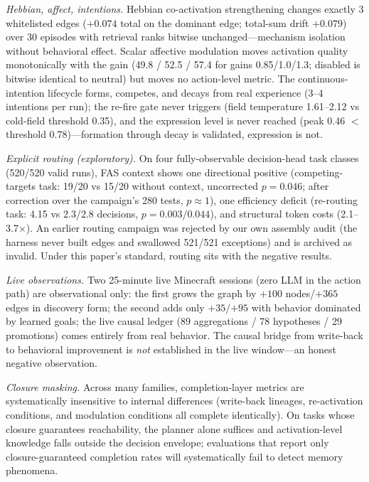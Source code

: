 \documentclass[10pt,a4paper]{article}
\begin{document}
\emph{Hebbian, affect, intentions.} Hebbian co-activation strengthening changes exactly 3 whitelisted edges ($+0.074$ total on the dominant edge; total-sum drift $+0.079$) over 30 episodes with retrieval ranks bitwise unchanged---mechanism isolation without behavioral effect. Scalar affective modulation moves activation quality monotonically with the gain (49.8 / 52.5 / 57.4 for gains 0.85/1.0/1.3; disabled is bitwise identical to neutral) but moves no action-level metric. The continuous-intention lifecycle forms, competes, and decays from real experience (3--4 intentions per run); the re-fire gate never triggers (field temperature 1.61--2.12 vs cold-field threshold 0.35), and the expression level is never reached (peak 0.46 $<$ threshold 0.78)---formation through decay is validated, expression is not.

\emph{Explicit routing (exploratory).} On four fully-observable decision-head task classes (520/520 valid runs), FAS context shows one directional positive (competing-targets task: 19/20 vs 15/20 without context, uncorrected $p{=}0.046$; after correction over the campaign's 280 tests, $p{\approx}1$), one efficiency deficit (re-routing task: 4.15 vs 2.3/2.8 decisions, $p{=}0.003$/$0.044$), and structural token costs (2.1--3.7$\times$). An earlier routing campaign was rejected by our own assembly audit (the harness never built edges and swallowed 521/521 exceptions) and is archived as invalid. Under this paper's standard, routing sits with the negative results.

\emph{Live observations.} Two 25-minute live Minecraft sessions (zero LLM in the action path) are observational only: the first grows the graph by $+100$ nodes/$+365$ edges in discovery form; the second adds only $+35$/$+95$ with behavior dominated by learned goals; the live causal ledger (89 aggregations / 78 hypotheses / 29 promotions) comes entirely from real behavior. The causal bridge from write-back to behavioral improvement is \emph{not} established in the live window---an honest negative observation.

\emph{Closure masking.} Across many families, completion-layer metrics are systematically insensitive to internal differences (write-back lineages, re-activation conditions, and modulation conditions all complete identically). On tasks whose closure guarantees reachability, the planner alone suffices and activation-level knowledge falls outside the decision envelope; evaluations that report only closure-guaranteed completion rates will systematically fail to detect memory phenomena.
\end{document}
